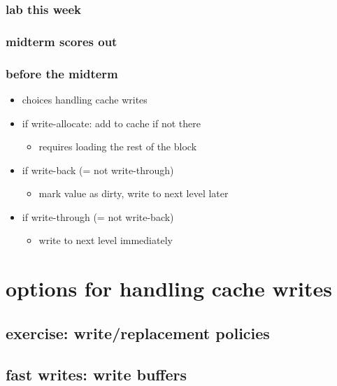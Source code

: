 \date{}
\title{}
\date{}

\begin{frame}
    \titlepage
\end{frame}



\begin{frame}
\frametitle{lab this week}
\end{frame}

\begin{frame}
\frametitle{midterm scores out}
\end{frame}

\begin{frame}
\frametitle{before the midterm}
\begin{itemize}
\item choices handling cache writes
\item if write-allocate: add to cache if not there
    \begin{itemize}
    \item requires loading the rest of the block
    \end{itemize}
\item if write-back (= not write-through)
    \begin{itemize}
    \item mark value as dirty, write to next level later
    \end{itemize}
\item if write-through (= not write-back)
    \begin{itemize}
    \item write to next level immediately
    \end{itemize}
\end{itemize}
\end{frame}

\section{options for handling cache writes}


\subsection{exercise: write/replacement policies}


\subsection{fast writes: write buffers}


